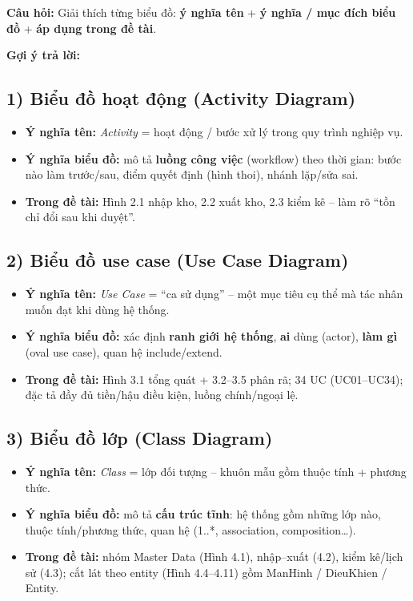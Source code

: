 \documentclass[12pt,a4paper]{article}
\newcommand{\cau}[1]{\textbf{\textcolor{qblue}{Câu hỏi:}} #1}
\newcommand{\traloi}{\par\smallskip\textbf{\textcolor{qblue!70!black}{Gợi ý trả lời:}}\par}
\begin{document}
\begin{cauhoi}
\cau{Giải thích từng biểu đồ: \textbf{ý nghĩa tên} + \textbf{ý nghĩa / mục đích biểu đồ} + \textbf{áp dụng trong đề tài}.}
\traloi

\subsection*{1) Biểu đồ hoạt động (Activity Diagram)}
\begin{itemize}[leftmargin=1.4em,itemsep=3pt]
  \item \textbf{Ý nghĩa tên:} \textit{Activity} = hoạt động / bước xử lý trong quy trình nghiệp vụ.
  \item \textbf{Ý nghĩa biểu đồ:} mô tả \textbf{luồng công việc} (workflow) theo thời gian: bước nào làm trước/sau, điểm quyết định (hình thoi), nhánh lặp/sửa sai.
  \item \textbf{Trong đề tài:} Hình 2.1 nhập kho, 2.2 xuất kho, 2.3 kiểm kê -- làm rõ ``tồn chỉ đổi sau khi duyệt''.
\end{itemize}

\subsection*{2) Biểu đồ use case (Use Case Diagram)}
\begin{itemize}[leftmargin=1.4em,itemsep=3pt]
  \item \textbf{Ý nghĩa tên:} \textit{Use Case} = ``ca sử dụng'' -- một mục tiêu cụ thể mà tác nhân muốn đạt khi dùng hệ thống.
  \item \textbf{Ý nghĩa biểu đồ:} xác định \textbf{ranh giới hệ thống}, \textbf{ai} dùng (actor), \textbf{làm gì} (oval use case), quan hệ include/extend.
  \item \textbf{Trong đề tài:} Hình 3.1 tổng quát + 3.2--3.5 phân rã; 34 UC (UC01--UC34); đặc tả đầy đủ tiền/hậu điều kiện, luồng chính/ngoại lệ.
\end{itemize}

\subsection*{3) Biểu đồ lớp (Class Diagram)}
\begin{itemize}[leftmargin=1.4em,itemsep=3pt]
  \item \textbf{Ý nghĩa tên:} \textit{Class} = lớp đối tượng -- khuôn mẫu gồm thuộc tính + phương thức.
  \item \textbf{Ý nghĩa biểu đồ:} mô tả \textbf{cấu trúc tĩnh}: hệ thống gồm những lớp nào, thuộc tính/phương thức, quan hệ (1..*, association, composition\ldots).
  \item \textbf{Trong đề tài:} nhóm Master Data (Hình 4.1), nhập--xuất (4.2), kiểm kê/lịch sử (4.3); cắt lát theo entity (Hình 4.4--4.11) gồm ManHinh / DieuKhien / Entity.
\end{itemize}


\end{cauhoi}
\end{document}
